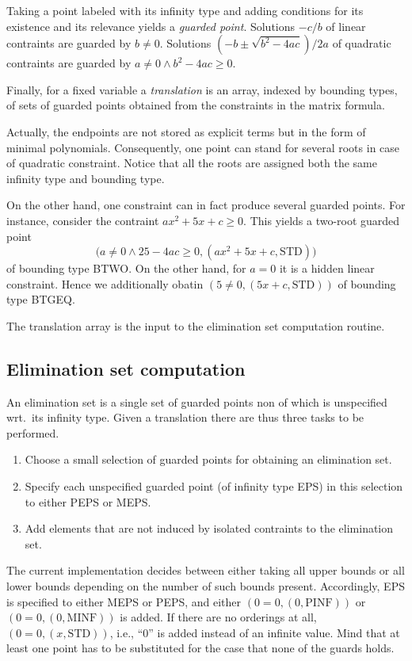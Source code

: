 Taking a point labeled with its infinity type and adding conditions
for its existence and its relevance yields a {\em guarded point}. 
Solutions $-c/b$ of linear contraints are guarded by $b\neq 0$. 
Solutions $(-b\pm\sqrt{b^2-4ac})/2a$ of quadratic contraints are
guarded by $a\neq0\land b^2-4ac\geq0$.

Finally, for a fixed variable a {\em translation} is an array, indexed
by bounding types, of sets of guarded points obtained from the
constraints in the matrix formula.

Actually, the endpoints are not stored as explicit terms but in the
form of minimal polynomials. Consequently, one point can stand for
several roots in case of quadratic constraint. Notice that all the
roots are assigned both the same infinity type and bounding type.

On the other hand, one constraint can in fact produce several guarded
points. For instance, consider the contraint $ax^2+5x+c\geq0$. This
yields a two-root guarded point
$$
\bigl(a\neq0\land 25-4ac\geq0,(ax^2+5x+c,\mbox{STD})\bigr)
$$
of bounding type BTWO. On the other hand, for $a=0$ it is a hidden
linear constraint. Hence we additionally obatin
$(5\neq0,(5x+c,\mbox{STD}))$ of bounding type BTGEQ.

The translation array is the input to the elimination set computation
routine.
%
\subsection{Elimination set computation}
An elimination set is a single set of guarded points non of which is
unspecified wrt.~its infinity type. Given a translation there are thus
three tasks to be performed.
\begin{enumerate}
\item Choose a small selection of guarded points for obtaining an
elimination set.
\item Specify each unspecified guarded point (of infinity type EPS) in
this selection to either PEPS or MEPS.
\item Add elements that are not induced by isolated contraints to the
elimination set.
\end{enumerate}
%
The current implementation decides between either taking all upper
bounds or all lower bounds depending on the number of such bounds
present. Accordingly, EPS is specified to either MEPS or PEPS, and
either $(0=0,(0,\mbox{PINF}))$ or $(0=0,(0,\mbox{MINF}))$ is added. If
there are no orderings at all, $(0=0,(x,\mbox{STD}))$, i.e., ``$0$''
is added instead of an infinite value. Mind that at least one point
has to be substituted for the case that none of the guards holds.

